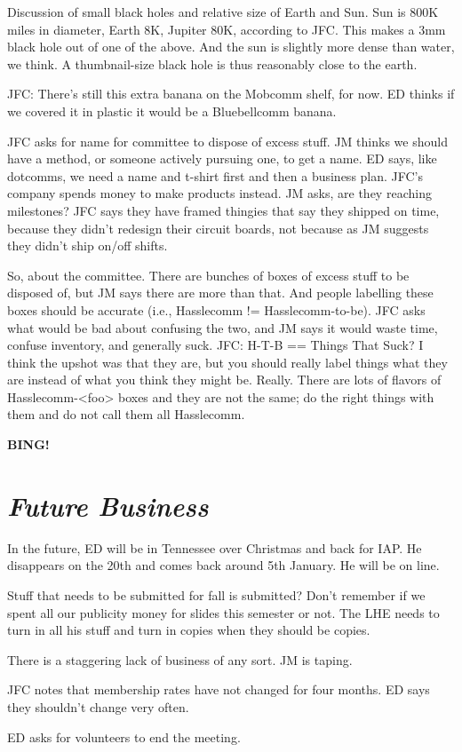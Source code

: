 \documentclass[10pt]{article}
\newcommand{\bing}{{\bf BING!} }
\newcommand{\goto}[1]{\bing \vskip 12pt \section*{{\em{#1}}}}
\begin{document}
Discussion of small black holes and relative size of Earth and Sun.
Sun is 800K miles in diameter, Earth 8K, Jupiter 80K, according to
JFC.  This makes a 3mm black hole out of one of the above.  And the
sun is slightly more dense than water, we think.  A thumbnail-size
black hole is thus reasonably close to the earth.

JFC: There's still this extra banana on the Mobcomm shelf, for now.
ED thinks if we covered it in plastic it would be a Bluebellcomm
banana.

JFC asks for name for committee to dispose of excess stuff.  JM thinks
we should have a method, or someone actively pursuing one, to get a
name.  ED says, like dotcomms, we need a name and t-shirt first and
then a business plan.  JFC's company spends money to make products
instead.  JM asks, are they reaching milestones?  JFC says they have
framed thingies that say they shipped on time, because they didn't
redesign their circuit boards, not because as JM suggests they didn't
ship on/off shifts.  

So, about the committee.  There are bunches of boxes of excess stuff
to be disposed of, but JM says there are more than that.  And people
labelling these boxes should be accurate (i.e., Hasslecomm !=
Hasslecomm-to-be).  JFC asks what would be bad about confusing the
two, and JM says it would waste time, confuse inventory, and generally
suck.  JFC: H-T-B == Things That Suck?  I think the upshot was that
they are, but you should really label things what they are instead of
what you think they might be.  Really.  There are lots of flavors of
Hasslecomm-<foo> boxes and they are not the same; do the right things
with them and do not call them all Hasslecomm.  


\goto{Future Business}
In the future, ED will be in Tennessee over Christmas and back for
IAP.  He disappears on the 20th and comes back around 5th January.  He
will be on line.  

Stuff that needs to be submitted for fall is submitted?  Don't
remember if we spent all our publicity money for slides this semester
or not.  The LHE needs to turn in all his stuff and turn in copies
when they should be copies.

There is a staggering lack of business of any sort.  JM is taping.

JFC notes that membership rates have not changed for four months.  ED
says they shouldn't change very often.  

ED asks for volunteers to end the meeting.  
\end{document}
